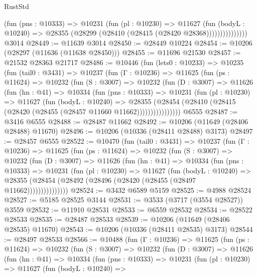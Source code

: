 \begin{lexlean}{RustStd}
\begin{coremodule}
                    (fun (pns : @10333) =>
                    @10231
                      (fun (pl : @10230) =>
                      @11627
                        (fun (bodyL : @10240) =>
                        @28355 (@28299 (@28410 (@28415 (@28420 @28368)))))))))))))))
    @3014
@28449 := @11639 @3014
@28450 := @28449 @10224
@28454 := @10206 (@28297 (@11636 (@11638 @28450)))
@28455 := @11696 @21530
@28457 := @21532 @28363 @21717
@28486 := @10446
    (fun (lets0 : @10233) =>
    @10235
      (fun (tail0 : @3431) =>
      @10237
        (fun (Γ : @10236) =>
        @11625
          (fun (ps : @11624) =>
          @10232
            (fun (S : @3007) =>
            @10232
              (fun (D : @3007) =>
              @11626
                (fun (hn : @41) =>
                @10334
                  (fun (pns : @10333) =>
                  @10231
                    (fun (pl : @10230) =>
                    @11627
                      (fun (bodyL : @10240) =>
                      @28355
                        (@28454
                          (@28410 (@28415 (@28420 (@28455 (@28457 @11660 @11662))))))))))))))))
    @6555
@28487 := @3416 @6555
@28488 := @28487 @11662
@28492 := @10206 (@11649 (@28406 @28488) @11670)
@28496 := @10206 (@10336 (@28411 @28488) @3173)
@28497 := @28457 @6555
@28522 := @10470
    (fun (tail0 : @3431) =>
    @10237
      (fun (Γ : @10236) =>
      @11625
        (fun (ps : @11624) =>
        @10232
          (fun (S : @3007) =>
          @10232
            (fun (D : @3007) =>
            @11626
              (fun (hn : @41) =>
              @10334
                (fun (pns : @10333) =>
                @10231
                  (fun (pl : @10230) =>
                  @11627
                    (fun (bodyL : @10240) =>
                    @28355 (@28454 (@28492 (@28496 (@28420 (@28455 (@28497 @11662)))))))))))))))
@28524 := @3432 @6589 @5159
@28525 := @4988 @28524
@28527 := @5185 @28525 @3144
@28531 := @3533 (@3717 (@3554 @28527)) @3559
@28532 := @11910 @28531
@28533 := @6559 @28532
@28534 := @28522 @28533
@28535 := @28487 @28533
@28539 := @10206 (@11649 (@28406 @28535) @11670)
@28543 := @10206 (@10336 (@28411 @28535) @3173)
@28544 := @28497 @28533
@28566 := @10488
    (fun (Γ : @10236) =>
    @11625
      (fun (ps : @11624) =>
      @10232
        (fun (S : @3007) =>
        @10232
          (fun (D : @3007) =>
          @11626
            (fun (hn : @41) =>
            @10334
              (fun (pns : @10333) =>
              @10231
                (fun (pl : @10230) =>
                @11627
                  (fun (bodyL : @10240) =>

\end{coremodule}
\end{lexlean}
